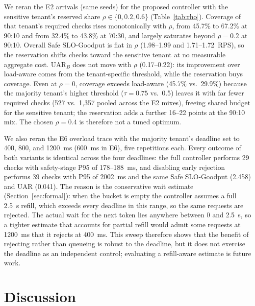 \documentclass[conference]{IEEEtran}
\begin{document}
We reran the E2 arrivals (same seeds) for the proposed controller with the sensitive tenant's reserved share $\rho \in \{0, 0.2, 0.6\}$ (Table~\ref{tab:rho}). Coverage of that tenant's required checks rises monotonically with $\rho$, from 45.7\% to 67.2\% at 90:10 and from 32.4\% to 43.8\% at 70:30, and largely saturates beyond $\rho = 0.2$ at 90:10. Overall Safe SLO-Goodput is flat in $\rho$ (1.98--1.99 and 1.71--1.72~RPS), so the reservation shifts checks toward the sensitive tenant at no measurable aggregate cost. $\mathrm{UAR}_B$ does not move with $\rho$ (0.17--0.22): its improvement over load-aware comes from the tenant-specific threshold, while the reservation buys coverage. Even at $\rho = 0$, coverage exceeds load-aware (45.7\% vs.\ 29.9\%) because the majority tenant's higher threshold ($\tau{=}0.75$ vs.\ 0.5) leaves it with far fewer required checks (527 vs.\ 1{,}357 pooled across the E2 mixes), freeing shared budget for the sensitive tenant; the reservation adds a further 16--22 points at the 90:10 mix. The chosen $\rho = 0.4$ is therefore not a tuned optimum.

We also reran the E6 overload trace with the majority tenant's deadline set to 400, 800, and 1200~ms (600~ms in E6), five repetitions each. Every outcome of both variants is identical across the four deadlines: the full controller performs 29 checks with safety-stage P95 of 178--188~ms, and disabling early rejection performs 39 checks with P95 of 2002~ms and the same Safe SLO-Goodput (2.458) and UAR (0.041). The reason is the conservative wait estimate (Section~\ref{sec:formal}): when the bucket is empty the controller assumes a full 2.5~s refill, which exceeds every deadline in this range, so the same requests are rejected. The actual wait for the next token lies anywhere between 0 and 2.5~s, so a tighter estimate that accounts for partial refill would admit some requests at 1200~ms that it rejects at 400~ms. This sweep therefore shows that the benefit of rejecting rather than queueing is robust to the deadline, but it does not exercise the deadline as an independent control; evaluating a refill-aware estimate is future work.

\section{Discussion}
\end{document}
